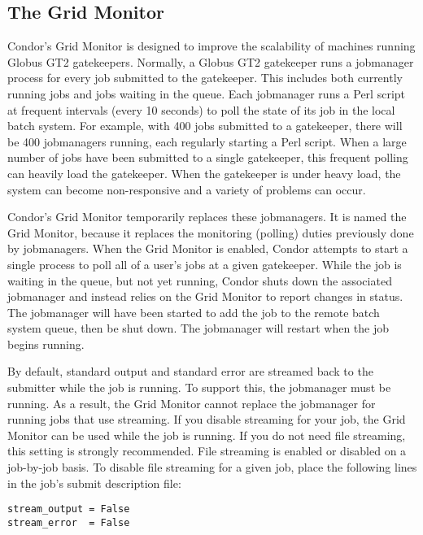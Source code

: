 \subsection{\label{sec:Condor-G-GridMonitor}The Grid Monitor}

Condor's Grid Monitor is designed to improve the scalability of
machines running Globus GT2 gatekeepers.
Normally, a Globus GT2 gatekeeper runs a jobmanager process for 
every job submitted to the gatekeeper.
This includes both currently running jobs and jobs waiting in the queue.
Each jobmanager runs a Perl script at
frequent intervals (every 10 seconds) to poll the state of its job in the local batch system.
For example, with 400 jobs submitted to a gatekeeper,
there will be 400 jobmanagers running,
each regularly starting a Perl script.
When a large number of jobs
have been submitted to a single gatekeeper,
this frequent polling can heavily load the gatekeeper.
When the gatekeeper is under heavy load,
the system can become non-responsive and a variety of problems can occur.

Condor's Grid Monitor temporarily replaces these jobmanagers.
It is named the Grid Monitor, because it replaces the monitoring
(polling) duties previously done by jobmanagers.
When the Grid Monitor is enabled,
Condor attempts to start a single
process to poll all of a user's jobs at a given gatekeeper.
While the job is waiting in the queue, but not yet running,
Condor shuts down the associated jobmanager and instead
relies on the Grid Monitor to report changes in status.
The jobmanager will have been started to add the job to the remote
batch system queue, then be shut down.
The jobmanager will restart when the job begins running.

By default, standard output and standard error are streamed back
to the submitter while the job is running.
To support this, the jobmanager must be running.
As a result, the Grid Monitor cannot
replace the jobmanager for running jobs that use streaming.
If you disable streaming for your job,
the Grid Monitor can be used while the job is running.
If you do not need file streaming, this setting is strongly recommended.
File streaming is enabled or disabled on a job-by-job basis.
To disable file streaming for a given job, place the
following lines in the job's submit description file:

\begin{verbatim}
stream_output = False
stream_error  = False
\end{verbatim}

